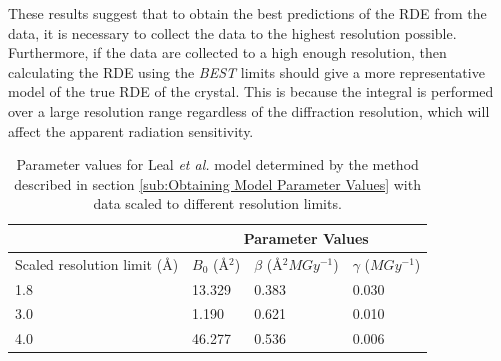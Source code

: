 These results suggest that to obtain the best predictions of the RDE from the data, it is necessary to collect the data to the highest resolution possible.
Furthermore, if the data are collected to a high enough resolution, then calculating the RDE using the \textit{BEST} limits should give a more representative model of the true RDE of the crystal.
This is because the integral is performed over a large resolution range regardless of the diffraction resolution, which will affect the apparent radiation sensitivity.

\begin{table}[ht!]
\small
\captionsetup{justification=centering}
	\caption[Parameter values for Leal \emph{et al.} model for data scaled to different resolution limits.]{Parameter values for Leal \emph{et al.} model determined by the method described in section \ref{sub:Obtaining Model Parameter Values} with data scaled to different resolution limits.}
	\centering
	\begin{tabular}{p{4cm} p{2.4cm} p{2.4cm} p{2cm}}
	\cline{2-4}
		& \multicolumn{3}{c}{Parameter Values} \\
		\hline
		Scaled resolution limit (\AA)			&$B_0$ (\AA$^2$)	  &$\beta$ (\AA$^2MGy^{-1}$) 	 	&$\gamma$ ($MGy^{-1}$)		\\
		\hline
		1.8     													&13.329	    &0.383 			&0.030			\\
		3.0     													&1.190		&0.621  		&0.010			\\
		4.0     													&46.277		&0.536  		&0.006			\\
		\hline
	\end{tabular}
	\label{tab:RDE params3}
\end{table}
